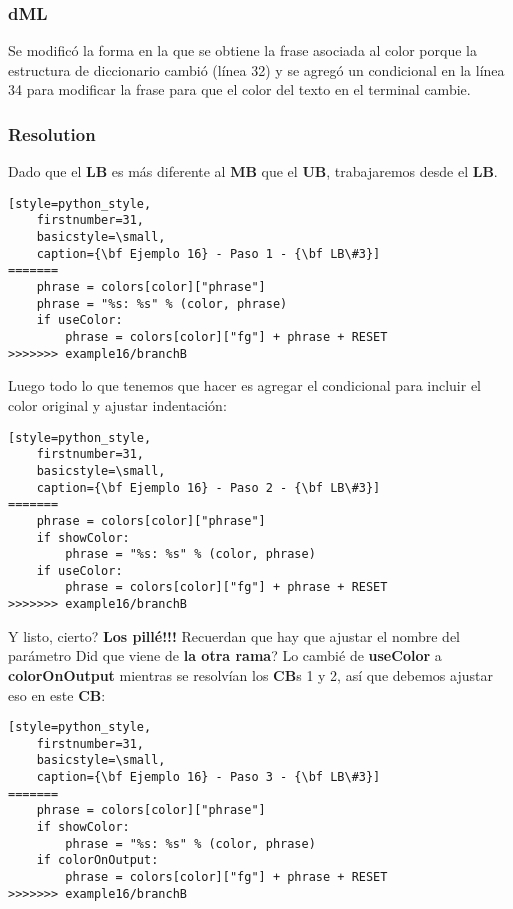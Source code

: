 \subsubsection{dML}
Se modificó la forma en la que se obtiene la frase asociada al color porque la estructura de diccionario cambió (línea 32)
y se agregó un condicional en la línea 34 para modificar la frase para que el color del texto en el terminal cambie.

\subsubsection{Resolution}
Dado que el {\bf LB} es más diferente al {\bf MB} que el {\bf UB}, trabajaremos desde el {\bf LB}.

\begin{lstlisting}[style=python_style,
	firstnumber=31,
	basicstyle=\small,
	caption={\bf Ejemplo 16} - Paso 1 - {\bf LB\#3}]
=======
    phrase = colors[color]["phrase"]
    phrase = "%s: %s" % (color, phrase)
    if useColor:
        phrase = colors[color]["fg"] + phrase + RESET
>>>>>>> example16/branchB
\end{lstlisting}

Luego todo lo que tenemos que hacer es agregar el condicional para incluir el color original y ajustar indentación:

\begin{lstlisting}[style=python_style,
	firstnumber=31,
	basicstyle=\small,
	caption={\bf Ejemplo 16} - Paso 2 - {\bf LB\#3}]
=======
    phrase = colors[color]["phrase"]
    if showColor:
        phrase = "%s: %s" % (color, phrase)
    if useColor:
        phrase = colors[color]["fg"] + phrase + RESET
>>>>>>> example16/branchB
\end{lstlisting}

Y listo, cierto? {\bf Los pillé!!!} Recuerdan que hay que ajustar el nombre del parámetro Did que viene de {\bf la otra rama}?
Lo cambié de {\bf useColor} a {\bf colorOnOutput} mientras se resolvían los {\bf CB}s 1 y 2, así que debemos ajustar eso
en este {\bf CB}:

\begin{lstlisting}[style=python_style,
	firstnumber=31,
	basicstyle=\small,
	caption={\bf Ejemplo 16} - Paso 3 - {\bf LB\#3}]
=======
    phrase = colors[color]["phrase"]
    if showColor:
        phrase = "%s: %s" % (color, phrase)
    if colorOnOutput:
        phrase = colors[color]["fg"] + phrase + RESET
>>>>>>> example16/branchB
\end{lstlisting}

